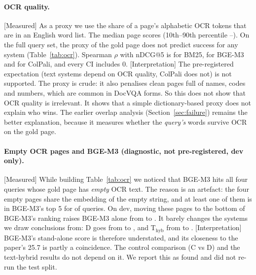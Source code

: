 \documentclass[11pt,a4paper]{article}
\newcommand{\lbl}[2]{\textsf{\scriptsize\textcolor{#1}{[#2]}}}
\newcommand{\Int}{\lbl{tagI}{Interpretation}}
\newcommand{\Mea}{\lbl{tagM}{Measured}}
\newcommand{\file}[1]{\texttt{\small\hyphenchar\font=`\/ #1}}
\begin{document}
\begin{table}[!htbp]\centering\small

\caption{\Mea{} BM25 $\rightarrow$ ColPali cascade on the test split.}\label{tab:cascade}
\end{table}

\paragraph{OCR quality.} \Mea{} As a proxy we use the share of a page's alphabetic OCR tokens that are in an English word list. The median page scores \ocrMedian{} (10th--90th percentile \ocrPtenth{}--\ocrPninety{}). On the full query set, the proxy of the gold page does not predict success for any system (Table~\ref{tab:ocr}). Spearman $\rho$ with nDCG@5 is \ocrRhoA{} for BM25, \ocrRhoBGE{} for BGE-M3 and \ocrRhoB{} for ColPali, and every CI includes 0.
\Int{} The pre-registered expectation (text systems depend on OCR quality, ColPali does not) is not supported. The proxy is crude: it also penalises clean pages full of names, codes and numbers, which are common in DocVQA forms. So this does not show that OCR quality is irrelevant. It shows that a simple dictionary-based proxy does not explain who wins. The earlier overlap analysis (Section~\ref{sec:failure}) remains the better explanation, because it measures whether the \emph{query's} words survive OCR on the gold page.

\begin{table}[!htbp]\centering\small

\caption{\Mea{} OCR-quality proxy of the gold page vs Hit@5, full query set (\file{results/ocr\_quality/}).}\label{tab:ocr}
\end{table}

\paragraph{Empty OCR pages and BGE-M3 (diagnostic, not pre-registered, dev only).} \Mea{} While building Table~\ref{tab:ocr} we noticed that BGE-M3 hits all four queries whose gold page has \emph{empty} OCR text. The reason is an artefact: the four empty pages share the embedding of the empty string, and at least one of them is in BGE-M3's top 5 for \emptyTopFive{} of \nQueries{} queries. On dev, moving these pages to the bottom of BGE-M3's ranking raises BGE-M3 alone from \emptyBGEdev{} to \emptyBGEdevFixed{}. It barely changes the systems we draw conclusions from: D goes from \emptyDdev{} to \emptyDdevFixed{}, and T$_\text{hyb}$ from \emptyThybdev{} to \emptyThybdevFixed{}.
\Int{} BGE-M3's stand-alone score is therefore understated, and its closeness to the paper's 25.7 is partly a coincidence. The control comparison (C vs D) and the text-hybrid results do not depend on it. We report this as found and did not re-run the test split.
\end{document}
